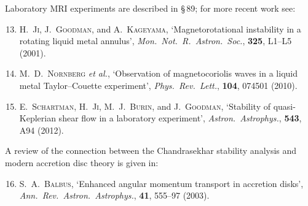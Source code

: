 \noindent Laboratory MRI experiments are described in \S\,89; for more
recent work see:

\begin{enumerate}
\setcounter{enumi}{12}
\item H.~\textsc{Ji}, J.~\textsc{Goodman}, and A.~\textsc{Kageyama},
  `Magnetorotational instability in a rotating liquid metal annulus',
  \textit{Mon.\ Not.\ R.\ Astron.\ Soc.}, \textbf{325}, L1--L5
  (2001).

\item M.~D.~\textsc{Nornberg} \textit{et al.},
  `Observation of magnetocoriolis waves in a liquid metal Taylor--Couette
  experiment',
  \textit{Phys.\ Rev.\ Lett.}, \textbf{104}, 074501 (2010).

\item E.~\textsc{Schartman}, H.~\textsc{Ji},
  M.~J.~\textsc{Burin}, and J.~\textsc{Goodman},
  `Stability of quasi-Keplerian shear flow in a laboratory experiment',
  \textit{Astron.\ Astrophys.}, \textbf{543}, A94 (2012).
\end{enumerate}

\noindent A review of the connection between the Chandrasekhar
stability analysis and modern accretion disc theory is given in:

\begin{enumerate}
\setcounter{enumi}{15}
\item S.~A.~\textsc{Balbus},
  `Enhanced angular momentum transport in accretion disks',
  \textit{Ann.\ Rev.\ Astron.\ Astrophys.}, \textbf{41}, 555--97
  (2003).
\end{enumerate}

